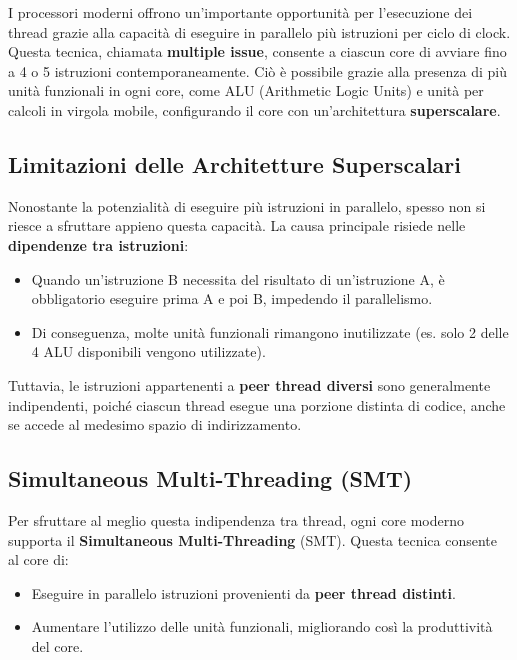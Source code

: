 I processori moderni offrono un'importante opportunità per l'esecuzione dei thread grazie alla capacità di eseguire in parallelo più istruzioni per ciclo di clock. Questa tecnica, chiamata \textbf{multiple issue}, consente a ciascun core di avviare fino a 4 o 5 istruzioni contemporaneamente. Ciò è possibile grazie alla presenza di più unità funzionali in ogni core, come ALU (Arithmetic Logic Units) e unità per calcoli in virgola mobile, configurando il core con un'architettura \textbf{superscalare}.

\subsection{Limitazioni delle Architetture Superscalari}

Nonostante la potenzialità di eseguire più istruzioni in parallelo, spesso non si riesce a sfruttare appieno questa capacità. La causa principale risiede nelle \textbf{dipendenze tra istruzioni}:

\begin{itemize}
    \item Quando un'istruzione B necessita del risultato di un'istruzione A, è obbligatorio eseguire prima A e poi B, impedendo il parallelismo.
    \item Di conseguenza, molte unità funzionali rimangono inutilizzate (es. solo 2 delle 4 ALU disponibili vengono utilizzate).
\end{itemize}

Tuttavia, le istruzioni appartenenti a \textbf{peer thread diversi} sono generalmente indipendenti, poiché ciascun thread esegue una porzione distinta di codice, anche se accede al medesimo spazio di indirizzamento. 

\subsection{Simultaneous Multi-Threading (SMT)}

Per sfruttare al meglio questa indipendenza tra thread, ogni core moderno supporta il \textbf{Simultaneous Multi-Threading} (SMT). Questa tecnica consente al core di:

\begin{itemize}
    \item Eseguire in parallelo istruzioni provenienti da \textbf{peer thread distinti}.
    \item Aumentare l'utilizzo delle unità funzionali, migliorando così la produttività del core.
\end{itemize}

